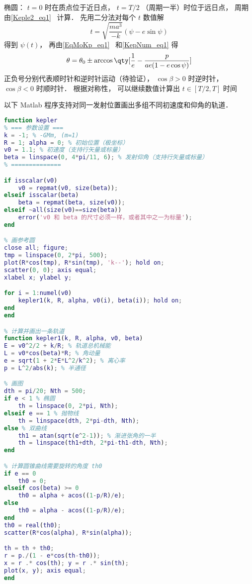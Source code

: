 椭圆： $t=0$ 时在质点位于近日点， $t=T/2$ （周期一半）时位于远日点， 周期由\autoref{Keple2_eq1}~ 计算． 先用二分法对每个 $t$ 数值解
\begin{equation}
t = \sqrt{\frac{ma^3}{-k}} (\psi - e \sin\psi)
\end{equation}
得到 $\psi(t)$， 再由\autoref{EqMoKp_eq1}~ 和\autoref{KepNum_eq1} 得
\begin{equation}
\theta = \theta_0 \pm \arccos\qty[\frac{1}{e} - \frac{p}{ae(1-e\cos\psi)}]
\end{equation}
正负号分别代表顺时针和逆时针运动（待验证）， $\cos\beta > 0$ 时逆时针， $\cos\beta < 0$ 时顺时针． 根据对称性， 可以继续数值计算出 $t\in[T/2,T]$ 时间

以下 Matlab 程序支持对同一发射位置画出多组不同初速度和仰角的轨道．

\begin{lstlisting}[language=matlab]
% 已知初始位置、发射速度、发射方向， 求轨道以及运动方程
function kepler
% === 参数设置 ===
k = -1; % -GMm, (m=1)
R = 1; alpha = 0; % 初始位置（极坐标）
v0 = 1.1; % 初速度（支持行矢量或标量）
beta = linspace(0, 4*pi/11, 6); % 发射仰角（支持行矢量或标量）
% ==============

if isscalar(v0)
    v0 = repmat(v0, size(beta));
elseif isscalar(beta)
    beta = repmat(beta, size(v0));
elseif ~all(size(v0)==size(beta))
    error('v0 和 beta 的尺寸必须一样，或者其中之一为标量');
end

% 画参考圆
close all; figure;
tmp = linspace(0, 2*pi, 500);
plot(R*cos(tmp), R*sin(tmp), 'k--'); hold on;
scatter(0, 0); axis equal;
xlabel x; ylabel y;

for i = 1:numel(v0)
    kepler1(k, R, alpha, v0(i), beta(i)); hold on;
end
end

% 计算并画出一条轨道
function kepler1(k, R, alpha, v0, beta)
E = v0^2/2 + k/R; % 轨道总机械能
L = v0*cos(beta)*R; % 角动量
e = sqrt(1 + 2*E*L^2/k^2); % 离心率
p = L^2/abs(k); % 半通径

% 画图
dth = pi/20; Nth = 500;
if e < 1 % 椭圆
    th = linspace(0, 2*pi, Nth);
elseif e == 1 % 抛物线
    th = linspace(dth, 2*pi-dth, Nth);
else % 双曲线
    th1 = atan(sqrt(e^2-1)); % 渐进张角的一半
    th = linspace(th1+dth, 2*pi-th1-dth, Nth);
end

% 计算圆锥曲线需要旋转的角度 th0
if e == 0
    th0 = 0;
elseif cos(beta) >= 0
    th0 = alpha + acos((1-p/R)/e);
else
    th0 = alpha - acos((1-p/R)/e);
end
th0 = real(th0);
scatter(R*cos(alpha), R*sin(alpha));

th = th + th0;
r = p./(1 - e*cos(th-th0));
x = r .* cos(th); y = r .* sin(th);
plot(x, y); axis equal;
end
\end{lstlisting}
